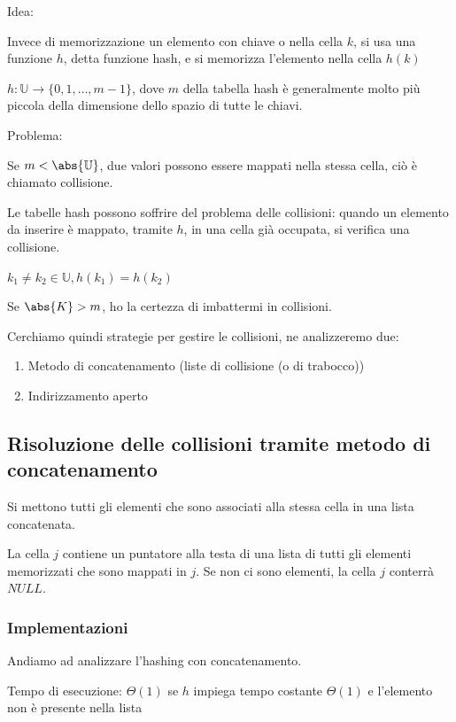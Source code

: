 \documentclass[tikz]{article}
\providecommand{\tightlist}{%
  \setlength{\itemsep}{0pt}\setlength{\parskip}{0pt}}
\begin{document}
{Idea:}

{Invece di memorizzazione un elemento con chiave o nella cella $k$, si usa una funzione $h$, detta funzione hash, e si memorizza l'elemento nella cella $h(k)$}


{$h:\mathbb{U}\rightarrow\{0,1,\ldots,m-1\}$, dove $m$ della tabella hash è generalmente molto più piccola della dimensione dello spazio di tutte le chiavi.}

{Problema: }

{Se $m < \abs{\mathbb{U}}$, due valori possono essere mappati nella stessa cella, ciò è chiamato collisione. }

{Le tabelle hash possono soffrire del problema delle collisioni: quando un elemento da inserire è mappato, tramite $h$, in una cella già occupata, si verifica una collisione.}

$k_1 \neq k_2 \in \mathbb{U}, h(k_1) = h(k_2)$

{Se $\abs{K} > m$, ho la certezza di imbattermi in collisioni.}

{Cerchiamo quindi strategie per gestire le collisioni, ne analizzeremo due:}

\begin{enumerate}
\tightlist
\item
  {Metodo di concatenamento (liste di collisione (o di trabocco))}
\item
  {Indirizzamento aperto}
\end{enumerate}

\subsection{Risoluzione delle collisioni tramite metodo di concatenamento}

{Si mettono tutti gli elementi che sono associati alla stessa cella in una lista concatenata.}

{La cella $j$ contiene un puntatore alla testa di una lista di tutti gli elementi memorizzati che sono mappati in $j$. Se non ci sono elementi, la cella $j$ conterrà $NULL$.}

\subsubsection{Implementazioni}

{Andiamo ad analizzare l'hashing con concatenamento.}



{Tempo di esecuzione: $\Theta(1)$ se $h$ impiega tempo costante $\Theta(1)$ e l'elemento non è presente nella lista}
\end{document}
